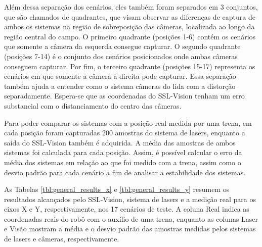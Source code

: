 \documentclass[acronym, symbols, table, deposito]{fei}
\begin{document}
				Além dessa separação dos cenários, eles também foram separados em 3 conjuntos, que são chamados de quadrantes, que visam observar as diferenças de captura de ambos os sistemas na região de sobreposição das câmeras, localizada ao longo da região central do campo. O primeiro quadrante (posições 1-6) contém os cenários que somente a câmera da esquerda consegue capturar. O segundo quadrante (posições 7-14) é o conjunto dos cenários posicionados onde ambas câmeras conseguem capturar. Por fim, o terceiro quadrante (posições 15-17) representa os cenários em que somente a câmera à direita pode capturar. Essa separação também ajuda a entender como o sistema câmeras do  lida com a distorção separadamente. Espera-se que as coordenadas do SSL-Vision tenham um erro substancial com o distanciamento do centro das câmeras.
				
				Para poder comparar os sistemas com a posição real medida por uma trena, em cada posição foram capturadas 200 amostras do sistema de lasers, enquanto a saída do SSL-Vision também é adquirida. A média das amostras de ambos sistemas foi calculada para cada posição. Assim, é possível calcular o erro da média dos sistemas em relação ao que foi medido com a trena, assim como o desvio padrão para cada cenário a fim de analisar a estabilidade dos sistemas.
				
				As Tabelas \ref{tbl:general_results_x} e \ref{tbl:general_results_y} resumem os resultados alcançados pelo SSL-Vision, sistema de lasers e a medição real para os eixos X e Y, respectivamente, nos 17 cenários de teste. A coluna Real indica as coordenadas reais do robô com o auxílio de uma trena, enquanto as colunas Laser e Visão mostram a média e o desvio padrão das amostras medidas pelos sistemas de lasers e câmeras, respectivamente.
				
\end{document}
